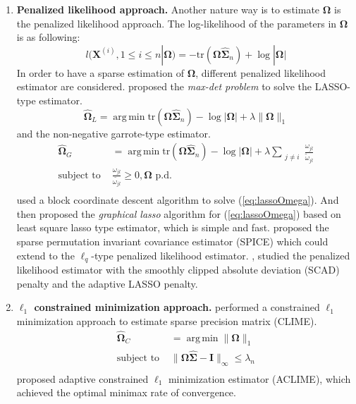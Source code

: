 \documentclass[11pt]{article}
\newcommand{\bX}{\mathbf X}
\newcommand{\bI}{\mathbf I}
\newcommand{\bOmega}{{\boldsymbol{\Omega}}}
\newcommand{\bSigma}{{\boldsymbol{\Sigma}}}
\DeclareMathOperator*{\argmin}{arg\,min}
\begin{document}
\begin{enumerate}
	\item \textbf{Penalized likelihood approach.}
	Another nature way is to estimate $\bOmega$ is the penalized likelihood approach. The log-likelihood of the parameters in $\bOmega$ is as following:
	\begin{equation}
		\label{eq:mle}
		l(\bX^(i), 1 \leq i \leq n|\bOmega) = -\text{tr}(\bOmega \hat{\bSigma}_n) + \log|\bOmega|
	\end{equation}
	In order to have a sparse estimation of $\bOmega$, different penalized likelihood estimator are considered. \cite{yuan2007model} proposed the \emph{max-det problem} to solve the LASSO-type estimator.
	\begin{equation}
	\label{eq:lassoOmega}
	\hat{\bOmega}_L = \argmin \text{tr}(\bOmega \hat{\bSigma}_n) - \log|\bOmega| + \lambda \|\bOmega\|_1
	\end{equation}
	and the non-negative garrote-type estimator. 
	\begin{equation}
	\label{eq:garroteOmega}
	\begin{aligned}
	 	\hat{\bOmega}_G &= \argmin \text{tr}(\bOmega \hat{\bSigma}_n) - \log|\bOmega| + \lambda \sum_{\substack{j \neq i}} \frac{\omega_{jl}}{\tilde{\omega}_{jl}} \\
	 	\text{subject to }& \frac{\omega_{jl}}{\tilde{\omega_{jl}}} \geq 0, \bOmega \text{ p.d.}\\
	\end{aligned}
	\end{equation}
	\cite{banerjee2008model} used a block coordinate descent algorithm to solve (\ref{eq:lassoOmega}). And then \cite{friedman2008sparse} proposed the \emph{graphical lasso} algorithm for (\ref{eq:lassoOmega}) based on least square lasso type estimator, which is simple and fast. \cite{rothman2008sparse} proposed the sparse permutation invariant covariance estimator (SPICE) which could extend to the $\ell_q$-type penalized likelihood estimator. \cite{fan2009network}, \cite{lam2009sparsistency} studied the penalized likelihood estimator with the smoothly clipped absolute deviation (SCAD) penalty and the adaptive LASSO penalty.
	
	\item \textbf{$\ell_1$ constrained minimization approach.}
	\cite{cai2011constrained} performed a constrained $\ell_1$ minimization approach to estimate sparse precision matrix (CLIME). 
	\begin{equation}
	\label{eq:clime}
	\begin{aligned}
	\hat{\bOmega}_{C} &= \argmin \|\bOmega\|_1 \\
	\text{subject to }& \|\bOmega \hat{\bSigma} - \bI \|_{\infty} \leq \lambda_n\\
	\end{aligned}
	\end{equation}
	\cite{cai2016estimating} proposed adaptive constrained $\ell_1$ minimization estimator (ACLIME), which achieved the optimal minimax rate of convergence. 
\end{enumerate}
  
\end{document}
